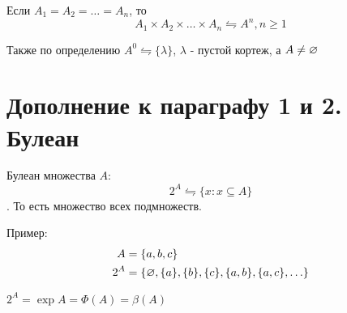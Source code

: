 \medksip

Если $A_1 = A_2 = \ldots = A_n$, то \[
A_1\times A_2\times \ldots\times A_n \leftrightharpoons A^{n}, n\ge 1
\] 

Также по определению $A^{0} \leftrightharpoons \{\lambda\} $, $\lambda$ - пустой кортеж,
а  $A \neq  \varnothing$

\section{Дополнение к параграфу 1 и 2. Булеан}
\begin{definition}
Булеан множества $A$:  \[
2^{A} \leftrightharpoons \{x:x \subseteq A\} 
\].
То есть множество всех подмножеств.
\end{definition}

Пример:
\begin{align*}
	A &= \{a,b,c\} \\
	2^{A} &= \{\varnothing, \{a\}, \{b\}, \{c\}, \{a,b\}, \{a,c\},\ldots     \} 
\end{align*}

\medskip

$2^{A} = \exp A=\Phi(A)=\beta(A)$


